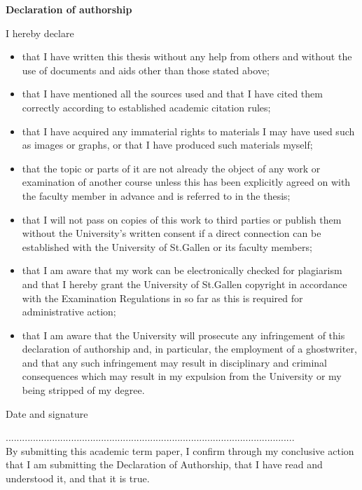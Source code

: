 \Large
\textbf{Declaration of authorship}

\vspace{1cm}

\normalsize
I hereby declare
\begin{itemize}
  \item that I have written this thesis without any help from others and without the use of documents and aids other than those stated above;
  \item that I have mentioned all the sources used and that I have cited them correctly according to established academic citation rules;
  \item that I have acquired any immaterial rights to materials I may have used such as images or graphs, or that I have produced such materials myself;
  \item that the topic or parts of it are not already the object of any work or examination of another course unless this has been explicitly agreed on with the faculty member in advance and is referred to in the thesis;
  \item that I will not pass on copies of this work to third parties or publish them without the University’s written consent if a direct connection can be established with the University of St.Gallen or its faculty members;
  \item that I am aware that my work can be electronically checked for plagiarism and that I hereby grant the University of St.Gallen copyright in accordance with the Examination Regulations in so far as this is required for administrative action;
  \item that I am aware that the University will prosecute any infringement of this declaration of authorship and, in particular, the employment of a ghostwriter, and that any such infringement may result in disciplinary and criminal consequences which may result in my expulsion from the University or my being stripped of my degree.
\end{itemize}

\vspace{0.5cm}

Date and signature

\vspace{1.5cm}

..........................................................................................................
\\
By submitting this academic term paper, I confirm through my conclusive action that I am submitting the Declaration of Authorship, that I have read and understood it, and that it is true.